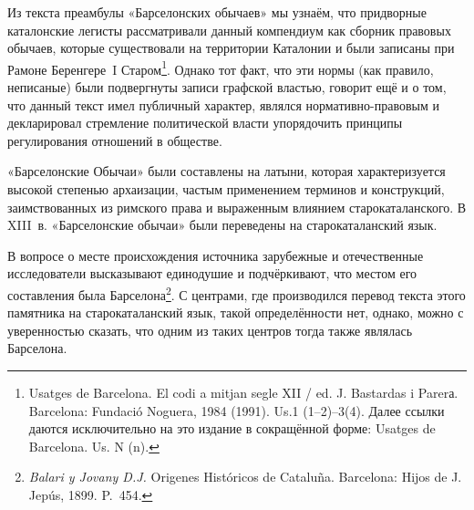 Из текста преамбулы «Барселонских обычаев» мы узнаём, что придворные каталонские легисты рассматривали данный компендиум как сборник правовых обычаев, которые существовали на территории Каталонии и были записаны при Рамоне Беренгере~I Старом\footnote{Usatges de Barcelona. El codi a mitjan segle XII / ed. J. Bastardas i Parerа. Barcelona: Fundació Noguera, 1984 (1991). Us.1 (1--2)--3(4). Далее ссылки даются исключительно на это издание в сокращённой форме: Usatges de Barcelona. Us. N (n).}. Однако тот факт, что эти нормы (как правило, неписаные) были подвергнуты записи графской властью, говорит ещё и о том, что данный текст имел публичный характер, являлся нормативно-правовым и декларировал стремление политической власти упорядочить принципы регулирования отношений в обществе.

«Барселонские Обычаи» были составлены на латыни, которая характеризуется высокой степенью архаизации, частым применением терминов и конструкций, заимствованных из римского права и выраженным влиянием старокаталанского. В XIII~в. «Барселонские обычаи» были переведены на старокаталанский язык.

В вопросе о месте происхождения источника зарубежные и отечественные исследователи высказывают единодушие и подчёркивают, что местом его составления была Барселона\footnote{\emph{ Balari y Jovany D.J.} Origenes Históricos de Cataluña. Barcelona: Hijos de J. Jepús, 1899. P.~454.}. С центрами, где производился перевод текста этого памятника на старокаталанский язык, такой определённости нет, однако, можно с уверенностью сказать, что одним из таких центров тогда также являлась Барселона.

